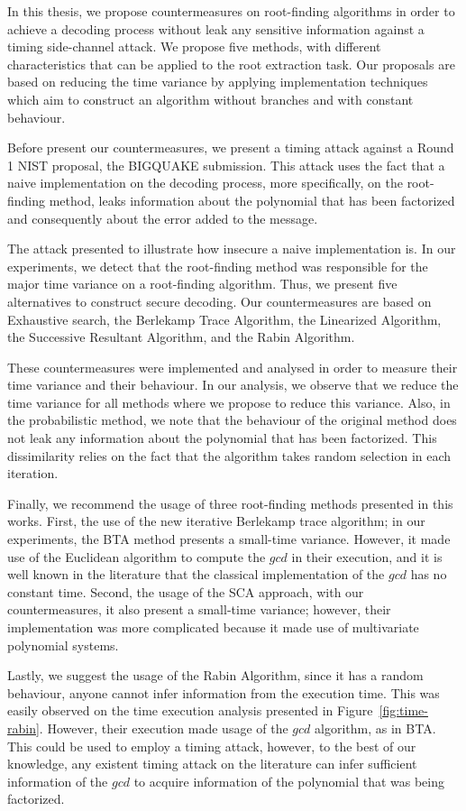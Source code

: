 In this thesis, we propose countermeasures on root-finding algorithms in order to achieve a decoding process without leak any sensitive information against a timing side-channel attack. We propose five methods, with different characteristics that can be applied to the root extraction task. Our proposals are based on reducing the time variance by applying implementation techniques which aim to construct an algorithm without branches and with constant behaviour. 

Before present our countermeasures, we present a timing attack against a Round 1 NIST proposal, the BIGQUAKE submission. This attack uses the fact that a naive implementation on the decoding process, more specifically, on the root-finding method, leaks information about the polynomial that has been factorized and consequently about the error added to the message. 

The attack presented to illustrate how insecure a naive implementation is. In our experiments, we detect that the root-finding method was responsible for the major time variance on a root-finding algorithm. Thus, we present five alternatives to construct secure decoding. Our countermeasures are based on Exhaustive search, the Berlekamp Trace Algorithm, the Linearized Algorithm, the Successive Resultant Algorithm, and the Rabin Algorithm. 

These countermeasures were implemented and analysed in order to measure their time variance and their behaviour. In our analysis, we observe that we reduce the time variance for all methods where we propose to reduce this variance. Also, in the probabilistic method, we note that the behaviour of the original method does not leak any information about the polynomial that has been factorized. This dissimilarity relies on the fact that the algorithm takes random selection in each iteration.

Finally, we recommend the usage of three root-finding methods presented in this works. First, the use of the new iterative Berlekamp trace algorithm; in our experiments, the BTA method presents a small-time variance. However, it made use of the Euclidean algorithm to compute the $gcd$ in their execution, and it is well known in the literature that the classical implementation of the $gcd$ has no constant time. Second, the usage of the SCA approach, with our countermeasures, it also present a small-time variance; however, their implementation was more complicated because it made use of multivariate polynomial systems.

Lastly, we suggest the usage of the Rabin Algorithm, since it has a random behaviour, anyone cannot infer information from the execution time. This was easily observed on the time execution analysis presented in Figure~\ref{fig:time-rabin}. However, their execution made usage of the $gcd$ algorithm, as in BTA. This could be used to employ a timing attack, however, to the best of our knowledge, any existent timing attack on the literature can infer sufficient information of the $gcd$ to acquire information of the polynomial that was being factorized.

